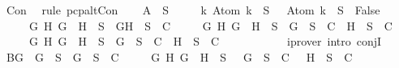 \begin{isabellebody}
\ Con\ \isamarkupfalse%
\ {\isacharparenleft}rule\ pcp{\isacharunderscore}alt{}Con{}{\isacharparenright}\isanewline
\ \ \isamarkupfalse%
\ A{\isacharcolon}{\isachardoublequoteopen}{\isasymbottom}\ {\isasymnotin}\ S\isanewline
\ \ \ \ {\isasymand}\ {\isacharparenleft}{\isasymforall}k{\isachardot}\ Atom\ k\ {\isasymin}\ S\ {\isasymlongrightarrow}\ \isactrlbold {\isasymnot}\ {\isacharparenleft}Atom\ k{\isacharparenright}\ {\isasymin}\ S\ {\isasymlongrightarrow}\ False{\isacharparenright}\isanewline
\ \ \ \ {\isasymand}\ {\isacharparenleft}{\isasymforall}G\ H{\isachardot}\ G\ \isactrlbold {\isasymand}\ H\ {\isasymin}\ S\ {\isasymlongrightarrow}\ {\isacharbraceleft}G{\isacharcomma}H{\isacharbraceright}\ {\isasymunion}\ S\ {\isasymin}\ C{\isacharparenright}\isanewline
\ \ \ \ {\isasymand}\ {\isacharparenleft}{\isasymforall}G\ H{\isachardot}\ G\ \isactrlbold {\isasymor}\ H\ {\isasymin}\ S\ {\isasymlongrightarrow}\ {\isacharbraceleft}G{\isacharbraceright}\ {\isasymunion}\ S\ {\isasymin}\ C\ {\isasymor}\ {\isacharbraceleft}H{\isacharbraceright}\ {\isasymunion}\ S\ {\isasymin}\ C{\isacharparenright}\isanewline
\ \ \ \ {\isasymand}\ {\isacharparenleft}{\isasymforall}G\ H{\isachardot}\ G\ \isactrlbold {\isasymrightarrow}\ H\ {\isasymin}\ S\ {\isasymlongrightarrow}\ {\isacharbraceleft}\isactrlbold {\isasymnot}G{\isacharbraceright}\ {\isasymunion}\ S\ {\isasymin}\ C\ {\isasymor}\ {\isacharbraceleft}H{\isacharbraceright}\ {\isasymunion}\ S\ {\isasymin}\ C{\isacharparenright}{\isachardoublequoteclose}\isanewline
\ \ \ \ \isamarkupfalse%
\ {}\ {}\ {}\ {}\ \isamarkupfalse%
\ {\isacharparenleft}iprover\ intro{\isacharcolon}\ conjI{\isacharparenright}\isanewline
\ \ \isamarkupfalse%
\ B{\isacharcolon}{\isachardoublequoteopen}{\isacharparenleft}{\isasymforall}G{\isachardot}\ \isactrlbold {\isasymnot}\ {\isacharparenleft}\isactrlbold {\isasymnot}G{\isacharparenright}\ {\isasymin}\ S\ {\isasymlongrightarrow}\ {\isacharbraceleft}G{\isacharbraceright}\ {\isasymunion}\ S\ {\isasymin}\ C{\isacharparenright}\isanewline
\ \ \ \ {\isasymand}\ {\isacharparenleft}{\isasymforall}G\ H{\isachardot}\ \isactrlbold {\isasymnot}{\isacharparenleft}G\ \isactrlbold {\isasymand}\ H{\isacharparenright}\ {\isasymin}\ S\ {\isasymlongrightarrow}\ {\isacharbraceleft}\isactrlbold {\isasymnot}\ G{\isacharbraceright}\ {\isasymunion}\ S\ {\isasymin}\ C\ {\isasymor}\ {\isacharbraceleft}\isactrlbold {\isasymnot}\ H{\isacharbraceright}\ {\isasymunion}\ S\ {\isasymin}\ C{\isacharparenright}\isanewline

\end{isabellebody}
